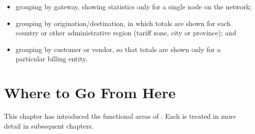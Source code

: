		\begin{itemize}
		\item grouping by gateway, showing statistics only for a single node
		      on the network;
		\item grouping by origination/destination, in which totals are shown for
		      each country or other administrative region (tariff zone, city or
		      province); and
		\item grouping by customer or vendor, so that totals are shown only for
		      a particular billing entity.
		\end{itemize}

\section{Where to Go From Here}
This chapter has introduced the functional areas of \XCDR{}. Each is treated in more
detail in subsequent chapters.
\endinput
